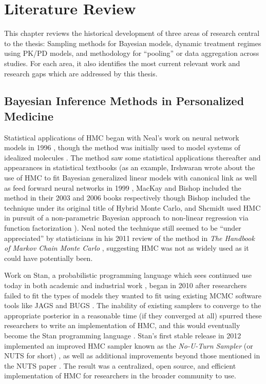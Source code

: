 \chapter{Literature Review}

This chapter reviews the historical development of three areas of research central to the thesis: Sampling methods for Bayesian models, dynamic treatment regimes using PK/PD models, and methodology for “pooling” or data aggregation across studies. For each area, it also identifies the most current relevant work and research gaps which are addressed by this thesis.



\section{Bayesian Inference Methods in Personalized Medicine}

Statistical applications of HMC began with Neal's work on neural network models in 1996 \cite{Neal1996-vn, brooks2011handbook}, though the method was initially used to model systems of idealized molecules \cite{duane1987hybrid}. The method saw some statistical applications thereafter and appearances in statistical textbooks (as an example, Irshwaran wrote about the use of HMC to fit Bayesian generalized linear models with canonical link as well as feed forward neural networks in 1999 \cite{ishwaran1999applications}, MacKay \cite[Chapter~30]{mackay2003information} and Bishop \cite[Chapter~11]{Bishop2006pattern} included the method in their 2003 and 2006 books respectively though Bishop included the technique under its original title of Hybrid Monte Carlo, and Shcmidt used HMC in pursuit of a non-parametric Bayesian approach to non-linear regression via function factorization \cite{schmidt2009function}). Neal noted the technique still seemed to be ``under appreciated'' by statisticians in his 2011 review of the method in \textit{The Handbook of Markov Chain Monte Carlo} \cite[Chapter~5]{brooks2011handbook}, suggesting HMC was not as widely used as it could have potentially been.

Work on Stan, a probabilistic programming language which sees continued use today in both academic and industrial work \cite{betancourt2014geometric}, began in 2010 \cite{stan2012} after researchers failed to fit the types of models they wanted to fit using existing MCMC software tools like JAGS \cite{plummer2003jags} and BUGS \cite{lunn2000winbugs}.  The inability of existing samplers to converge to the appropriate posterior in a reasonable time (if they converged at all) spurred these researchers to write an implementation of HMC, and this would eventually become the Stan programming language \cite{stan2012}.  Stan's first stable release in 2012 \cite{stan2012} implemented an improved HMC sampler known as the \textit{No-U-Turn Sampler} (or NUTS for short) \cite{stan2012, hoffman2014no}, as well as additional improvements beyond those mentioned in the NUTS paper \cite{stan2012}.  The result was a centralized, open source, and efficient implementation of HMC for researchers in the broader community to use.

